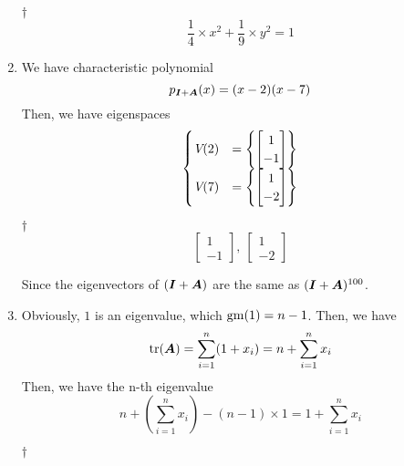 \documentclass[a4paper,12pt]{article}
\begin{document}
\begin{enumerate}
\begin{answer}{$\dag$}
\begin{equation}
            \frac{1}{4} \times x^2 + \frac{1}{9} \times y^2 = 1    
        \end{equation}
    \end{answer}
    \item We have characteristic polynomial \begin{equation}
        p_{\boldsymbol{I} + \boldsymbol{A}}(x) = (x - 2)(x - 7) 
    \end{equation} Then, we have eigenspaces \begin{equation}
        \begin{cases}
            \textit{V}(2) & = \left\{\begin{bmatrix}
                1 \\
                -1
            \end{bmatrix}\right\} \\
            \textit{V}(7) & = \left\{\begin{bmatrix}
                1 \\
                -2
            \end{bmatrix}\right\} \\
        \end{cases}
    \end{equation}
    \begin{answer}{$\dag$}\begin{equation}
            \begin{bmatrix}
                1 \\
                -1
            \end{bmatrix}, \ \begin{bmatrix}
                1 \\
                -2
            \end{bmatrix}
        \end{equation}
    \end{answer} Since the eigenvectors of $(\boldsymbol{I} + \boldsymbol{A})$ are the same as $(\boldsymbol{I} + \boldsymbol{A})^{100}$.
    \item Obviously, $1$ is an eigenvalue, which $\operatorname{gm}(1) = n - 1$. Then, we have \begin{equation}
        \operatorname{tr}(\boldsymbol{A}) = \sum_{i = 1}^{n}(1 + x_i) = n + \sum_{i = 1}^{n}x_i
    \end{equation} Then, we have the n-th eigenvalue \begin{equation}
        n + (\sum_{i = 1}^{n}x_i) - (n - 1) \times 1 = 1 + \sum_{i = 1}^{n}x_i
    \end{equation}
    \begin{answer}{$\dag$}\begin{equation}

\end{equation}
\end{answer}
\end{enumerate}
\end{document}
